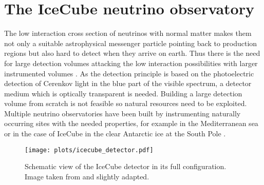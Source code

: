 \chapter{The IceCube neutrino observatory}

The low interaction cross section of neutrinos with normal matter makes them not only a suitable astrophysical messenger particle pointing back to production regions but also hard to detect when they arrive on earth.
Thus there is the need for large detection volumes attacking the low interaction possibilities with larger instrumented volumes .
As the detection principle is based on the photoelectric detection of Cerenkov light in the blue part of the visible spectrum, a detector medium which is optically transparent is needed.
Building a large detection volume from scratch is not feasible so natural resources need to be exploited.
Multiple neutrino observatories have been built by instrumenting naturally occurring sites with the needed properties, for example in the Mediterranean sea or in the case of IceCube in the clear Antarctic ice at the South Pole .

\begin{figure}[htbp]
  \centering
  \texttt{[image: plots/icecube\_detector.pdf]}
  \caption{
    Schematic view of the IceCube detector in its full configuration.
    Image taken from  and slightly adapted.
  }
  \label{fig:icecube_detector}
\end{figure}


